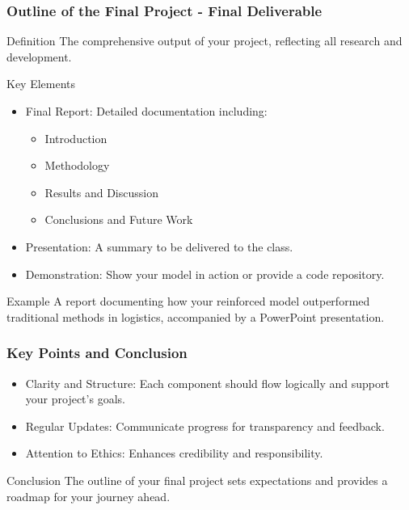 \documentclass[aspectratio=169]{beamer}
\begin{document}
\begin{frame}[fragile]
  \frametitle{Outline of the Final Project - Final Deliverable}
  \begin{block}{Definition}
    The comprehensive output of your project, reflecting all research and development.
  \end{block}

  \begin{block}{Key Elements}
    \begin{itemize}
      \item Final Report: Detailed documentation including:
      \begin{itemize}
        \item Introduction
        \item Methodology
        \item Results and Discussion
        \item Conclusions and Future Work
      \end{itemize}
      \item Presentation: A summary to be delivered to the class.
      \item Demonstration: Show your model in action or provide a code repository.
    \end{itemize}
  \end{block}

  \begin{block}{Example}
    A report documenting how your reinforced model outperformed traditional methods in logistics, accompanied by a PowerPoint presentation.
  \end{block}
\end{frame}

\begin{frame}[fragile]
  \frametitle{Key Points and Conclusion}
  \begin{itemize}
    \item Clarity and Structure: Each component should flow logically and support your project's goals.
    \item Regular Updates: Communicate progress for transparency and feedback.
    \item Attention to Ethics: Enhances credibility and responsibility.
  \end{itemize}
  
  \begin{block}{Conclusion}
    The outline of your final project sets expectations and provides a roadmap for your journey ahead.
  \end{block}
\end{frame}
\end{document}
